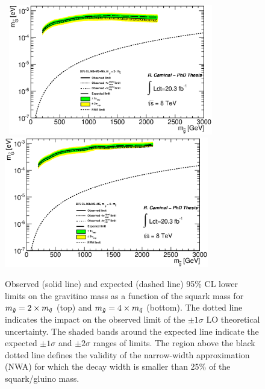 \begin{figure}[!ht]
\begin{center}
\mbox{
\includegraphics[width=0.795\textwidth]{Interpretations/Figures/ModelIndependentGravitino_combined_mGLimit_Stop_A4_A9_A102mqmg.eps}
}
\mbox{
\includegraphics[width=0.795\textwidth]{Interpretations/Figures/ModelIndependentGravitino_combined_mGLimit_Stop_A4_A9_A104mqmg.eps}
}
\end{center}
\caption[95\% CL lower limits on the gravitino mass as a function of the squark mass for $m_{\gluino} = 2 \times m_{\squark}$ and $m_{\gluino} = 4 \times m_{\squark}$.]{Observed (solid line) and expected (dashed line) 95\% CL lower limits on the gravitino mass as a function of the squark mass for $m_{\gluino} = 2 \times m_{\squark}$ (top) and $m_{\gluino} = 4 \times m_{\squark}$ (bottom). The dotted line indicates the impact on the observed limit of the $\pm1\sigma$ LO theoretical uncertainty. The shaded bands around the expected line indicate the expected $\pm1\sigma$ and $\pm2\sigma$ ranges of limits. 
  The region above the black dotted line defines the validity of the narrow-width approximation (NWA) for which the decay width is smaller than 25\% of the squark/gluino mass.}
\label{fig:GravitinoMassExclusion_xmqmg}
\end{figure}

